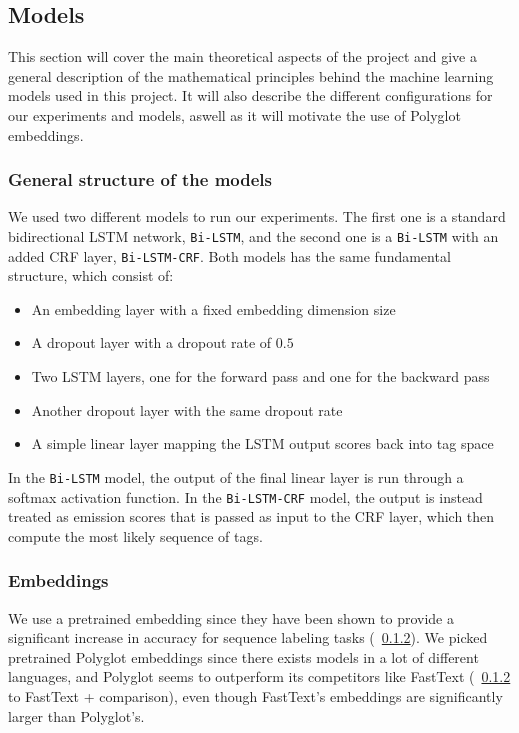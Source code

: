 
\subsection{Models}

This section will cover the main theoretical aspects of the project and give a
general description of the mathematical principles behind the machine learning
models used in this project. It will also describe the different configurations
for our experiments and models, aswell as it will motivate the use of Polyglot
embeddings.


\subsubsection{General structure of the models}

We used two different models to run our experiments. The first one is a standard
bidirectional LSTM network, \texttt{Bi-LSTM}, and the second one is a
\texttt{Bi-LSTM} with an added CRF layer, \texttt{Bi-LSTM-CRF}. Both models has
the same fundamental structure, which consist of:

\begin{itemize}
    \item An embedding layer with a fixed embedding dimension size
    \item A dropout layer with a dropout rate of $0.5$
    \item Two LSTM layers, one for the forward pass and one for the backward
        pass
    \item Another dropout layer with the same dropout rate
    \item A simple linear layer mapping the LSTM output scores back into tag
        space
\end{itemize}

In the \texttt{Bi-LSTM} model, the output of the final linear layer is run
through a softmax activation function. In the \texttt{Bi-LSTM-CRF} model, the
output is instead treated as emission scores that is passed as input to the CRF
layer, which then compute the most likely sequence of tags.



\subsubsection{Embeddings}

We use a pretrained embedding since they have been shown to provide a
significant increase in accuracy for sequence labeling tasks (~\ref{}).
We picked pretrained Polyglot embeddings since there exists models in a lot of
different languages, and Polyglot seems to outperform its competitors like
FastText (~\ref{} to FastText + comparison), even though FastText's embeddings are
significantly larger than Polyglot's.

